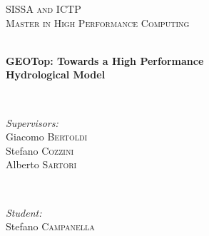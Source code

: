 
\thispagestyle{empty}

\begingroup
\center %


\textsc{\LARGE SISSA and ICTP}\\[1.5cm]
\textsc{\Large Master in High Performance Computing}\\[0.5cm]


\HRule \\[0.4cm]
{ \huge 
  \bfseries GEOTop: Towards a High Performance\\ Hydrological Model \par
}
\HRule \\[1.5cm]


\begin{minipage}{0.4\textwidth}
\begin{flushleft} \large
\emph{Supervisors:} \\
Giacomo \textsc{Bertoldi}\\
Stefano \textsc{Cozzini}\\
Alberto \textsc{Sartori}\\
\end{flushleft}
\end{minipage}
~
\begin{minipage}{0.4\textwidth}
\begin{flushright} \large
\emph{Student:}\\
Stefano \textsc{Campanella}
\end{flushright}
\end{minipage}\\[4cm]

